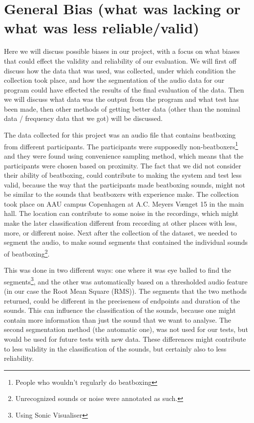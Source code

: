 \section{General Bias (what was lacking or what was less reliable/valid)}
Here we will discuss possible biases in our project, with a focus on what biases that could effect the validity and reliability of our evaluation. We will first off discuss how the data that was used, was collected, under which condition the collection took place, and how the segmentation of the audio data for our program could have effected the results of the final evaluation of the data. Then we will discuss what data was the output from the program and what test has been made, then other methods of getting better data (other than the nominal data / frequency data that we got) will be discussed.

The data collected for this project was an audio file that contains beatboxing from different participants. The participants were supposedly non-beatboxers\footnote{People who wouldn't regularly do beatboxing} and they were found using convenience sampling method, which means that the participants were chosen based on proximity. The fact that we did not consider their ability of beatboxing, could contribute to making the system and test less valid, because the way that the participants made beatboxing sounds, might not be similar to the sounds that beatboxers with experience make. The collection took place on AAU campus Copenhagen at A.C. Meyers Vænget 15 in the main hall. The location can contribute to some noise in the recordings, which might make the later classification different from recording at other places with less, more, or different noise. Next after the collection of the dataset, we needed to segment the audio, to make sound segments that contained the individual sounds of beatboxing\footnote{Unrecognized sounds or noise were annotated as such.}. 

This was done in two different ways: one where it was eye balled to find the segments\footnote{Using Sonic Visualiser}, and the other was automatically based on a thresholded audio feature (in our case the Root Mean Square (RMS)). The segments that the two methods returned, could be different in the preciseness of endpoints and duration of the sounds. This can influence the classification of the sounds, because one might contain more information than just the sound that we want to analyse. The second segmentation method (the automatic one), was not used for our tests, but would be used for future tests with new data. These differences might contribute to less validity in the classification of the sounds, but certainly also to less reliability.

